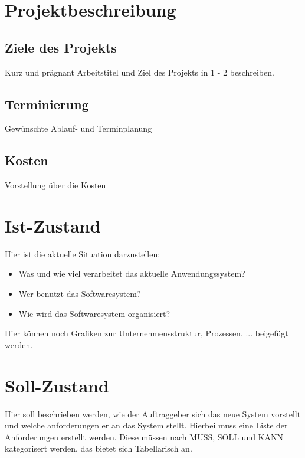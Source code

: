 \documentclass[10pt,a4paper]{article}
\begin{document}
    \maketitle
    \newpage
    \tableofcontents
    \newpage

    \section{Projektbeschreibung}
    \subsection{Ziele des Projekts}
    Kurz und prägnant Arbeitstitel und Ziel des Projekts in 1 - 2 beschreiben.
    \subsection{Terminierung}
    Gewünschte Ablauf- und Terminplanung
    \subsection{Kosten}
    Vorstellung über die Kosten

    \section{Ist-Zustand}
    Hier ist die aktuelle Situation darzustellen:
    \begin{itemize}
        \item Was und wie viel verarbeitet das aktuelle Anwendungssystem?
        \item Wer benutzt das Softwaresystem?
        \item Wie wird das Softwaresystem organisiert?
    \end{itemize}
    Hier können noch Grafiken zur Unternehmensstruktur, Prozessen, ... beigefügt werden.

    \section{Soll-Zustand}
    Hier soll beschrieben werden, wie der Auftraggeber sich das neue System vorstellt und 
    welche anforderungen er an das System stellt.
    Hierbei muss eine Liste der Anforderungen erstellt werden.
    Diese müssen nach MUSS, SOLL und KANN kategorisert werden.
    das bietet sich Tabellarisch an.
\end{document}
